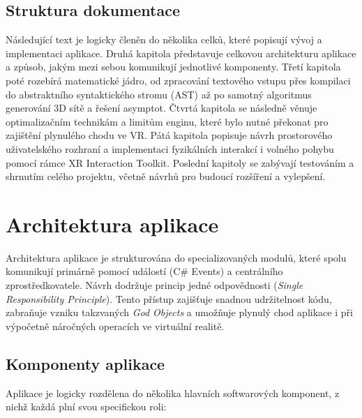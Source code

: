\documentclass[czech, kiv, sem, he, iso690alph, pdf,viewonly]{fasthesis}
\begin{document}
\section{Struktura dokumentace}
Následující text je logicky členěn do několika celků, které popisují vývoj a implementaci aplikace. 
Druhá kapitola představuje celkovou architekturu aplikace a způsob, jakým mezi sebou komunikují jednotlivé komponenty. 
Třetí kapitola poté rozebírá matematické jádro, od zpracování textového vstupu přes kompilaci do abstraktního syntaktického stromu (AST) až po samotný algoritmus generování 3D sítě a řešení asymptot. 
Čtvrtá kapitola se následně věnuje optimalizačním technikám a limitům enginu, které bylo nutné překonat pro zajištění plynulého chodu ve VR. 
Pátá kapitola popisuje návrh prostorového uživatelského rozhraní a implementaci fyzikálních interakcí i volného pohybu pomocí rámce XR Interaction Toolkit.
Poslední kapitoly se zabývají testováním a shrnutím celého projektu, včetně návrhů pro budoucí rozšíření a vylepšení.


\chapter{Architektura aplikace}
Architektura aplikace je strukturována do specializovaných modulů, které spolu komunikují primárně pomocí událostí (C\# Events) a centrálního zprostředkovatele. 
Návrh dodržuje princip jedné odpovědnosti (\textit{Single Responsibility Principle}). Tento přístup zajišťuje snadnou udržitelnost kódu, zabraňuje vzniku takzvaných 
\textit{God Objects} a umožňuje plynulý chod aplikace i při výpočetně náročných operacích ve virtuální realitě.

\section{Komponenty aplikace}
Aplikace je logicky rozdělena do několika hlavních softwarových komponent, z nichž každá plní svou specifickou roli:
\end{document}
